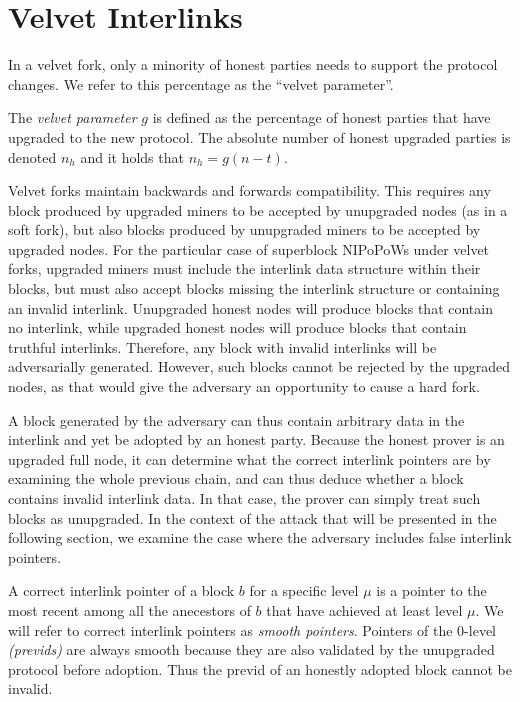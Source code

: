 \section{Velvet Interlinks}\label{sec:velvet}

In a velvet fork, only a minority of honest parties needs to support the protocol
changes. We refer to this percentage as the ``velvet parameter''.

\begin{definition}
	The \emph{velvet parameter} $g$ is defined as the percentage of honest parties
	that have upgraded to the new protocol. The absolute number of honest upgraded
	parties is denoted $n_h$ and it holds that
	$n_h = g (n - t)$.
	\label{defn:velvet_honest_majority}
\end{definition}

Velvet forks maintain backwards and forwards compatibility. This requires any block produced by upgraded miners to be accepted by unupgraded nodes (as in a soft fork), but also blocks produced by unupgraded miners to be accepted by upgraded nodes. For the particular case of superblock NIPoPoWs under velvet forks, upgraded miners must include the interlink data structure within their blocks, but must also accept blocks missing the interlink structure or containing an invalid interlink. Unupgraded honest nodes will produce blocks that contain no interlink, while upgraded honest nodes will produce blocks that contain truthful interlinks. Therefore, any block with invalid interlinks will be adversarially generated. However, such blocks cannot be rejected by the upgraded nodes, as that would give the adversary an opportunity to cause a hard fork.

A block generated by the adversary can thus contain arbitrary data in the interlink and yet be adopted by an honest party. Because the honest prover is an upgraded full node, it can determine what the correct interlink pointers are by examining the whole previous chain, and can thus deduce whether a block contains invalid interlink data. In that case, the prover can simply treat such blocks as unupgraded. In the context of the attack that will be presented in the following section, we examine the case where the adversary includes false interlink pointers.

A correct interlink pointer of a block $b$ for a specific level $\mu$ is a pointer to the most recent among all the anecestors of $b$ that have achieved at least level $\mu$. We will refer to correct interlink pointers as \emph{smooth pointers}. Pointers of the 0-level \textit{(previds)} are always smooth because they are also validated by the unupgraded protocol before adoption. Thus the previd of an
honestly adopted block cannot be invalid.

